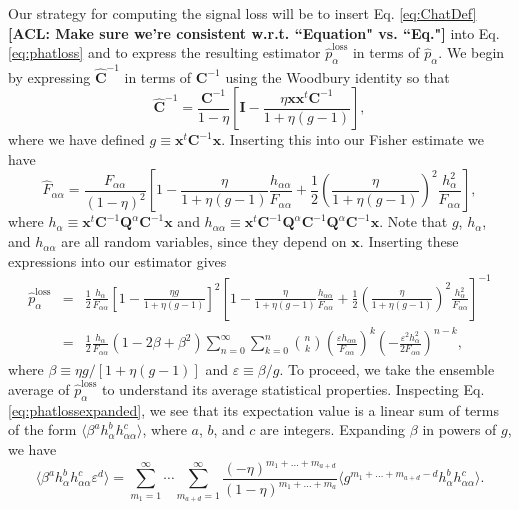 \documentclass[preprint2,numberedappendix,tighten]{aastex6}  %
\newcommand{\x}{\mathbf{x}}
\newcommand{\C}{\mathbf{C}}
\newcommand{\Chat}{\mathbf{\hat{C}}}
\newcommand{\Q}{\mathbf{Q}}
\newcommand{\I}{\mathbf{I}}
\newcommand{\acl}[1]{{\color{red} \textbf{[ACL:  #1]}}}
\begin{document}
Our strategy for computing the signal loss will be to insert Eq. \eqref{eq:ChatDef} \acl{Make sure we're consistent w.r.t. ``Equation" vs. ``Eq."} into Eq. \eqref{eq:phatloss} and to express the resulting estimator $\hat{p}_\alpha^\textrm{loss}$ in terms of $\hat{p}_\alpha$. We begin by expressing $\Chat^{-1}$ in terms of $\C^{-1}$ using the Woodbury identity so that
\begin{equation}
\Chat^{-1} = \frac{\C^{-1}}{1-\eta} \left[ \I - \frac{\eta \x \x^t \C^{-1}}{1+ \eta (g-1)}\right],
\end{equation}
where we have defined $g \equiv \x^t \C^{-1} \x$. Inserting this into our Fisher estimate we have
\begin{equation}
\hat{F}_{\alpha \alpha} = \frac{F_{\alpha \alpha}}{(1-\eta)^2} \left[ 1 -\frac{\eta }{1+ \eta (g-1)} \frac{h_{\alpha \alpha}}{F_{\alpha \alpha}} + \frac{1}{2} \left( \frac{\eta }{1+ \eta (g-1)} \right)^2 \frac{h_\alpha^2}{F_{\alpha \alpha}}\right],
\end{equation}
where $h_\alpha \equiv \x^t \C^{-1} \Q^\alpha \C^{-1} \x $ and $h_{\alpha \alpha} \equiv \x^t \C^{-1} \Q^\alpha \C^{-1} \Q^\alpha \C^{-1}\x $. Note that $g$, $h_\alpha$, and $h_{\alpha \alpha}$ are all random variables, since they depend on $\x$. Inserting these expressions into our estimator gives
\begin{eqnarray}
\label{eq:phatlossexpanded}
\hat{p}_\alpha^\textrm{loss} &=& \frac{1}{2} \frac{h_\alpha}{F_{\alpha \alpha}} \left[ 1 - \frac{\eta g}{1+ \eta (g-1)}\right]^2  \left[ 1 -\frac{\eta }{1+ \eta (g-1)} \frac{h_{\alpha \alpha}}{F_{\alpha \alpha}} + \frac{1}{2} \left( \frac{\eta }{1+ \eta (g-1)} \right)^2 \frac{h_\alpha^2}{F_{\alpha \alpha}}\right]^{-1} \nonumber \\
&=& \frac{1}{2} \frac{h_\alpha}{F_{\alpha \alpha}}\left(1-2\beta + \beta^2\right)\sum_{n=0}^\infty \sum_{k=0}^n {n \choose k} \left( \frac{\varepsilon h_{\alpha \alpha}}{F_{\alpha \alpha}}\right)^k \left( - \frac{\varepsilon^2 h_\alpha^2}{2 F_{\alpha \alpha}}\right)^{n-k},
\end{eqnarray}
where $\beta \equiv \eta g/[1+ \eta (g-1)]$ and $\varepsilon \equiv \beta / g$. To proceed, we take the ensemble average of $\hat{p}_\alpha^\textrm{loss}$ to understand its average statistical properties. Inspecting Eq. \eqref{eq:phatlossexpanded}, we see that its expectation value is a linear sum of terms of the form $\langle \beta^a h_\alpha^b h_{\alpha \alpha}^c \rangle$, where $a$, $b$, and $c$ are integers. Expanding $\beta$ in powers of $g$, we have
\begin{equation}
\label{eq:betahh}
\langle \beta^a h_\alpha^b h_{\alpha \alpha}^c \varepsilon^d \rangle = \sum_{m_1 = 1}^\infty \cdots \sum_{m_{a+d} = 1}^\infty \frac{(-\eta)^{m_1 + \dots + m_{a+d}}}{(1-\eta)^{m_1 + \dots + m_a}} \langle g^{m_1 + \dots + m_{a+d}-d} h_\alpha^b h_{\alpha \alpha}^c \rangle.
\end{equation}
\end{document}
